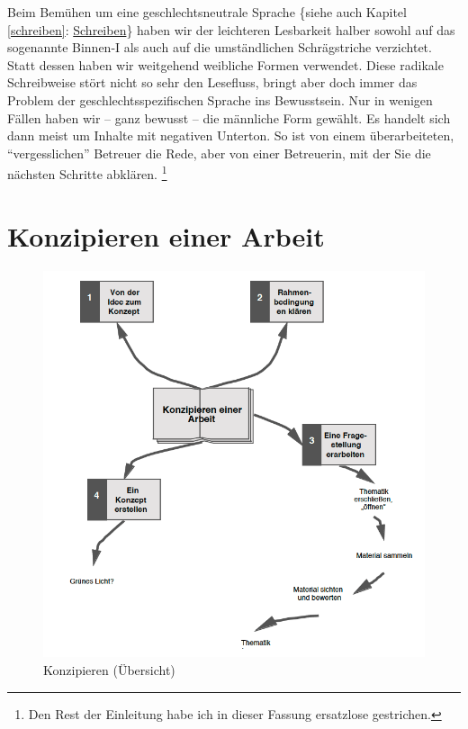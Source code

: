 \documentclass[]{book}
\let\rmarkdownfootnote\footnote%
\def\footnote{\protect\rmarkdownfootnote}
\theoremstyle{definition}
\theoremstyle{definition}
\theoremstyle{definition}
\theoremstyle{remark}
\begin{document}
Beim Bemühen um eine geschlechtsneutrale Sprache \{siehe auch Kapitel
\ref{schreiben}: \protect\hyperlink{schreiben}{Schreiben}\} haben wir
der leichteren Lesbarkeit halber sowohl auf das sogenannte Binnen-I als
auch auf die umständlichen Schrägstriche verzichtet. Statt dessen haben
wir weitgehend weibliche Formen verwendet. Diese radikale Schreibweise
stört nicht so sehr den Lesefluss, bringt aber doch immer das Problem
der geschlechtsspezifischen Sprache ins Bewusstsein. Nur in wenigen
Fällen haben wir -- ganz bewusst -- die männliche Form gewählt. Es
handelt sich dann meist um Inhalte mit negativen Unterton. So ist von
einem überarbeiteten, ``vergesslichen'' Betreuer die Rede, aber von
einer Betreuerin, mit der Sie die nächsten Schritte abklären. \footnote{Den
  Rest der Einleitung habe ich in dieser Fassung ersatzlose gestrichen.}

\hypertarget{konzipieren}{\chapter{Konzipieren einer
Arbeit}\label{konzipieren}}

\begin{figure}

{\centering \includegraphics{images/konzipieren-min} 

}

\caption{Konzipieren (Übersicht)}\label{fig:unnamed-chunk-1}
\end{figure}
\end{document}
